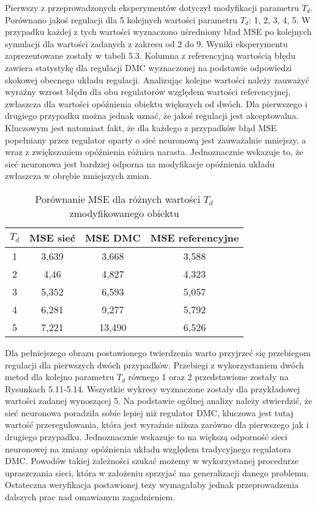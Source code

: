 \par Pierwszy z przeprowadzonych eksperymentów dotyczył modyfikacji parametru \(T_d\). Porównano jakoś regulacji dla 5 kolejnych wartości parametru \(T_d\): 1, 2, 3, 4, 5. W przypadku każdej z tych wartości wyznaczono uśredniony bład MSE po kolejnych symulacji dla wartości zadanych z zakresu od 2 do 9. Wyniki eksperymentu zaprezentowane zostały w tabeli 5.3. Kolumna z referencyjną wartością błędu zawiera statystykę dla regulacji DMC wyznaczonej na podstawie odpowiedzi skokowej obecnego układu regulacji. Analizując kolejne wartości należy zauważyć wyraźny wzrost błędu dla obu regulatorów względem wartości referencyjnej, zwłaszcza dla wartości opóźnienia obiektu większych od dwóch. Dla pierwszego i drugiego przypadku można jednak uznać, że jakoś regulacji jest akceptowalna.  Kluczowym jest natomiast fakt, że dla każdego z przypadków błąd MSE popełniany przez regulator oparty o sieć neuronową jest zauważalnie mniejszy, a wraz z zwiększaniem opóźnienia różnica narasta. Jednoznacznie wskazuje to, że sieć neuronowa jest bardziej odporna na modyfikacje opóźnienia układu zwłaszcza w obrębie mniejszych zmian. 

\begin{table}[!htb] \label{tab:tabela3} \centering
\caption{Porównanie MSE dla różnych wartości \(T_d\) zmodyfikowanego obiektu}
\begin{tabular} {| c | c | c | c |} \hline
    \(T_d\) & MSE sieć & MSE DMC & MSE referencyjne \\ \hline\hline
    1 & 3,639 & 3,668 & 3,588 \\ \hline
    2 & 4,46 & 4,827 & 4,323 \\ \hline
    3 & 5,352 & 6,593 & 5,057 \\ \hline
    4 & 6,281 & 9,277 & 5,792 \\ \hline
    5 & 7,221 & 13,490 & 6,526 \\ \hline
\end{tabular}
\end{table}

\par Dla pełniejszego obrazu postawionego twierdzenia warto przyjrzeć się przebiegom regulacji dla pierwszych dwóch przypadków. Przebiegi z wykorzystaniem dwóch metod dla kolejno parametru \(T_d\) równego 1 oraz 2 przedstawione zostały na Rysunkach 5.11-5.14. Wszystkie wykresy wyznaczone zostały dla przykładowej wartości zadanej wynoszącej 5. Na podstawie ogólnej analizy należy stwierdzić, że sieć neuronowa poradziła sobie lepiej niż regulator DMC, kluczowa jest tutaj wartość przeregulowania, która jest wyraźnie niższa zarówno dla pierwszego jak i drugiego przypadku. Jednoznacznie wskazuje to na większą odporność sieci neuronowej na zmiany opóźnienia układu względem tradycyjnego regulatora DMC. Powodów takiej zależności szukać możemy w wykorzystanej procedurze upraszczania sieci, która w założeniu sprzyjać ma generalizacji danego problemu. Ostateczna weryfikacja postawionej tezy wymagałaby jednak przeprowadzenia dalszych prac nad omawianym zagadnieniem. 

